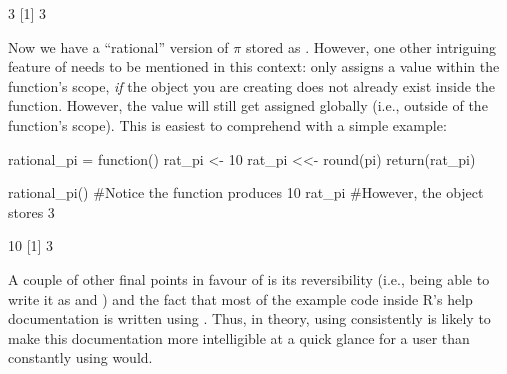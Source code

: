 \begin{outR}
[1] 3
[1] 3
\end{outR}

\noindent
Now we have a ``rational'' version of $\pi$ stored as .  However, one other intriguing feature of \R{{<}<-} needs to be mentioned in this context: \R{{<}<-} only assigns a value within the function's scope, \textit{if} the object you are creating does not already exist inside the function. However, the value will still get assigned globally (i.e., outside of the function's scope).  This is easiest to comprehend with a simple example:

\begin{inR}
rational_pi = function() {
  rat_pi <- 10
  rat_pi <<- round(pi)
  return(rat_pi)
}

rational_pi() #Notice the function produces 10
rat_pi #However, the object stores 3
\end{inR}
\begin{outR}
[1] 10
[1] 3
\end{outR}

A couple of other final points in favour of  \R{<-} is its reversibility (i.e., being able to write it as \R{->} and \R{->{>}}) and the fact that most of the example code inside R's help documentation is written using \R{<-}. Thus, in theory, using \R{<-} consistently is likely to make this documentation more intelligible at a quick glance for a user than constantly using \R{=} would.
